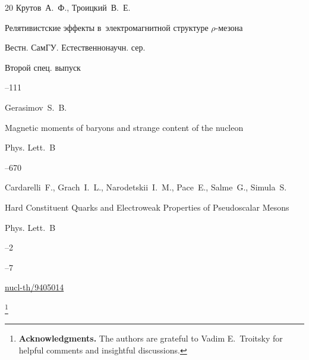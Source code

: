 \begin{thebibliography}{20}
\by Крутов~А.~Ф., Троицкий~В.~Е.

\paper   Релятивистские эффекты в~электромагнитной структуре $\rho$-мезона

\jour Вестн. СамГУ. Естественнонаучн. сер.


\issueinfo Второй спец. выпуск

--111




\by  Gerasimov~S.~B.

\paper  Magnetic moments of baryons and strange content of the nucleon

\jour Phys. Lett.~B



--670








\by   Cardarelli~F., Grach~I.~L., Narodetskii~I.~M., Pace~E., Salme~G., Simula~S.

\paper Hard Constituent Quarks and Electroweak Properties of Pseudoscalar Mesons

\jour Phys. Lett.~B



--2

--7


\arxiv \href{http://arxiv.org/abs/nucl-th/9405014}{nucl-th/9405014}



\end{thebibliography}



\RuDate





\pagebreak



\makeentitle





\thanks{{\bf Acknowledgments.} The authors are grateful to Vadim E.~Troitsky  for helpful comments and insightful discussions.

}



